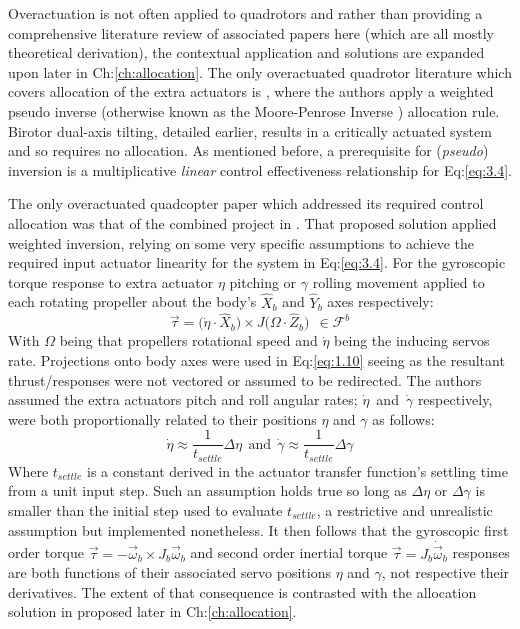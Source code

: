 \par
Overactuation is not often applied to quadrotors and rather than providing a comprehensive literature review of associated papers here (which are all mostly theoretical derivation), the contextual application and solutions are expanded upon later in Ch:\ref{ch:allocation}. The only overactuated quadrotor literature which covers allocation of the extra actuators is \cite{tiltgasco,tiltrihani}, where the authors apply a weighted pseudo inverse (otherwise known as the Moore-Penrose Inverse \cite{moorepenrose}) allocation rule. Birotor dual-axis tilting, detailed earlier, results in a critically actuated system and so requires no allocation. As mentioned before, a prerequisite for (\emph{pseudo}) inversion is a multiplicative \emph{linear} control effectiveness relationship for Eq:\ref{eq:3.4}. 
\par
The only overactuated quadcopter paper which addressed its required control allocation was that of the combined project in \cite{tiltgasco,tiltrihani}. That proposed solution applied weighted inversion, relying on some very specific assumptions to achieve the required input actuator linearity for the system in Eq:\ref{eq:3.4}. For the gyroscopic torque response to extra actuator $\eta$ pitching or $\gamma$ rolling movement applied to each rotating propeller about the body's $\hat{X}_b$ and $\hat{Y}_b$ axes respectively:
\begin{equation}\label{eq:1.10}
\vec{\tau}=\big(\dot{\eta}\cdot\hat{X}_b\big)\times J\big(\Omega\cdot\hat{Z}_b\big)~~\in\mathcal{F}^b
\end{equation}
With $\Omega$ being that propellers rotational speed and $\dot{\eta}$ being the inducing servos rate. Projections onto body axes were used in Eq:\ref{eq:1.10} seeing as the resultant thrust/responses were not vectored or assumed to be redirected. The authors assumed the extra actuators pitch and roll angular rates; $\dot{\eta}$~and~$\dot{\gamma}$ respectively, were both proportionally related to their positions $\eta$ and $\gamma$ as follows:
\begin{equation}
\dot{\eta}\approx \frac{1}{t_{settle}}\Delta\eta~~\text{and}~~\dot{\gamma}\approx \frac{1}{t_{settle}}\Delta\gamma
\end{equation}
Where $t_{settle}$ is a constant derived in the actuator transfer function's settling time from a unit input step. Such an assumption holds true so long as $\Delta\eta$ or $\Delta\gamma$ is smaller than the initial step used to evaluate $t_{settle}$, a restrictive and unrealistic assumption but implemented nonetheless. It then follows that the gyroscopic first order torque $\vec{\tau}=-\vec{\omega}_b\times J_b\vec{\omega}_b$ and second order inertial torque $\vec{\tau}=J_b\dot{\vec{\omega}}_b$ responses are both functions of their associated servo positions $\eta$ and $\gamma$, not respective their derivatives. The extent of that consequence is contrasted with the allocation solution in proposed later in Ch:\ref{ch:allocation}.
